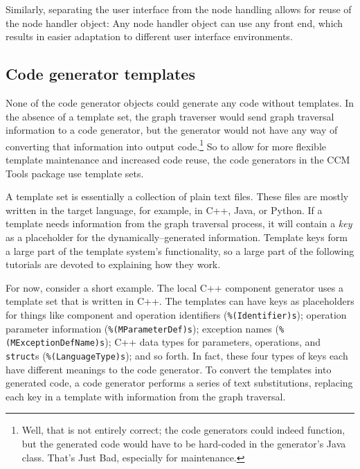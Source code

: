 Similarly, separating the user interface from the node handling allows for reuse
of the node handler object: Any node handler object can use any front end, which
results in easier adaptation to different user interface environments.

\subsection{Code generator templates}

None of the code generator objects could generate any code without templates. In
the absence of a template set, the graph traverser would send graph traversal
information to a code generator, but the generator would not have any way of
converting that information into output code.\footnote{Well, that is not
entirely correct; the code generators could indeed function, but the generated
code would have to be hard-coded in the generator's Java class. That's Just Bad,
especially for maintenance.} So to allow for more flexible template maintenance
and increased code reuse, the code generators in the CCM Tools package use
template sets.

A template set is essentially a collection of plain text files. These files are
mostly written in the target language, for example, in C++, Java, or Python. If
a template needs information from the graph traversal process, it will contain a
{\em key\/} as a placeholder for the dynamically--generated information.
Template keys form a large part of the template system's functionality, so a
large part of the following tutorials are devoted to explaining how they work.

For now, consider a short example. The local C++ component generator uses a
template set that is written in C++. The templates can have keys as placeholders
for things like component and operation identifiers (\verb+%(Identifier)s+);
operation parameter information (\verb+%(MParameterDef)s+); exception names
(\verb+%(MExceptionDefName)s+); C++ data types for parameters, operations, and
{\tt struct}s (\verb+%(LanguageType)s+); and so forth. In fact, these four types
of keys each have different meanings to the code generator. To convert the
templates into generated code, a code generator performs a series of text
substitutions, replacing each key in a template with information from the graph
traversal.

